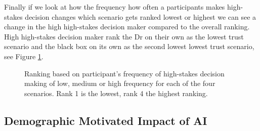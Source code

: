 \documentclass[manuscript,screen,review]{acmart}
\begin{document}
Finally if we look at how the frequency how often a participants makes high-stakes decision changes which scenario gets ranked lowest or highest we can see a change in the high high-stakes decision maker compared to the overall ranking. High high-stakes decision maker rank the Dr on their own as the lowest trust scenario and the black box on its own as the second lowest lowest trust scenario, see Figure \ref{fig:ranking-highstakes-decision}.

\begin{figure}[h]
    \caption{Ranking based on participant's frequency of high-stakes decision making of low, medium or high frequency for each of the four scenarios. Rank 1 is the lowest, rank 4 the highest ranking.}
    \label{fig:ranking-highstakes-decision}
\end{figure}














\subsection{Demographic Motivated Impact of AI}
\end{document}
